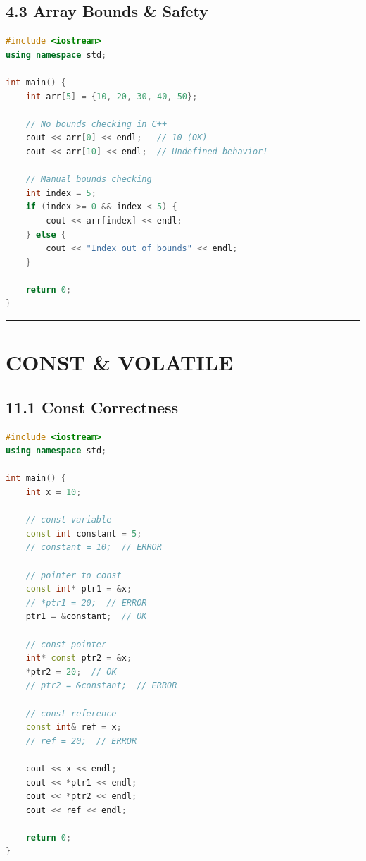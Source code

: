 \hypertarget{array-bounds-safety}{%
\subsection{4.3 Array Bounds \& Safety}\label{array-bounds-safety}}

\begin{lstlisting}[language={C++}]
#include <iostream>
using namespace std;

int main() {
    int arr[5] = {10, 20, 30, 40, 50};

    // No bounds checking in C++
    cout << arr[0] << endl;   // 10 (OK)
    cout << arr[10] << endl;  // Undefined behavior!

    // Manual bounds checking
    int index = 5;
    if (index >= 0 && index < 5) {
        cout << arr[index] << endl;
    } else {
        cout << "Index out of bounds" << endl;
    }

    return 0;
}
\end{lstlisting}

\begin{center}\rule{0.5\linewidth}{0.5pt}\end{center}

\hypertarget{const-volatile}{%
\section{CONST \& VOLATILE}\label{const-volatile}}

\hypertarget{const-correctness}{%
\subsection{11.1 Const Correctness}\label{const-correctness}}

\begin{lstlisting}[language={C++}]
#include <iostream>
using namespace std;

int main() {
    int x = 10;

    // const variable
    const int constant = 5;
    // constant = 10;  // ERROR

    // pointer to const
    const int* ptr1 = &x;
    // *ptr1 = 20;  // ERROR
    ptr1 = &constant;  // OK

    // const pointer
    int* const ptr2 = &x;
    *ptr2 = 20;  // OK
    // ptr2 = &constant;  // ERROR

    // const reference
    const int& ref = x;
    // ref = 20;  // ERROR

    cout << x << endl;
    cout << *ptr1 << endl;
    cout << *ptr2 << endl;
    cout << ref << endl;

    return 0;
}
\end{lstlisting}

